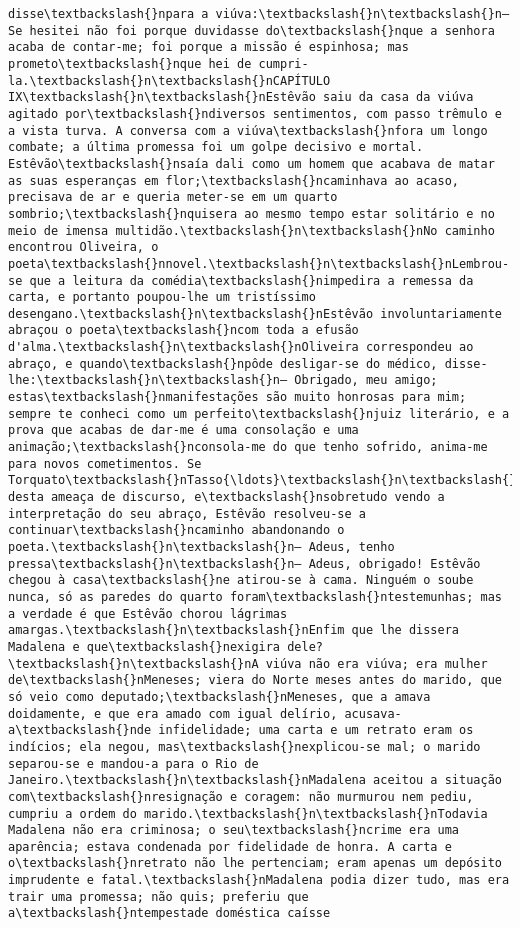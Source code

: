\begin{Verbatim}[commandchars=\\\{\}]
disse\textbackslash{}npara a viúva:\textbackslash{}n\textbackslash{}n— Se hesitei não foi porque duvidasse do\textbackslash{}nque a senhora acaba de contar-me; foi porque a missão é espinhosa; mas prometo\textbackslash{}nque hei de cumpri-la.\textbackslash{}n\textbackslash{}nCAPÍTULO IX\textbackslash{}n\textbackslash{}nEstêvão saiu da casa da viúva agitado por\textbackslash{}ndiversos sentimentos, com passo trêmulo e a vista turva. A conversa com a viúva\textbackslash{}nfora um longo combate; a última promessa foi um golpe decisivo e mortal. Estêvão\textbackslash{}nsaía dali como um homem que acabava de matar as suas esperanças em flor;\textbackslash{}ncaminhava ao acaso, precisava de ar e queria meter-se em um quarto sombrio;\textbackslash{}nquisera ao mesmo tempo estar solitário e no meio de imensa multidão.\textbackslash{}n\textbackslash{}nNo caminho encontrou Oliveira, o poeta\textbackslash{}nnovel.\textbackslash{}n\textbackslash{}nLembrou-se que a leitura da comédia\textbackslash{}nimpedira a remessa da carta, e portanto poupou-lhe um tristíssimo desengano.\textbackslash{}n\textbackslash{}nEstêvão involuntariamente abraçou o poeta\textbackslash{}ncom toda a efusão d'alma.\textbackslash{}n\textbackslash{}nOliveira correspondeu ao abraço, e quando\textbackslash{}npôde desligar-se do médico, disse-lhe:\textbackslash{}n\textbackslash{}n— Obrigado, meu amigo; estas\textbackslash{}nmanifestações são muito honrosas para mim; sempre te conheci como um perfeito\textbackslash{}njuiz literário, e a prova que acabas de dar-me é uma consolação e uma animação;\textbackslash{}nconsola-me do que tenho sofrido, anima-me para novos cometimentos. Se Torquato\textbackslash{}nTasso{\ldots}\textbackslash{}n\textbackslash{}nDiante desta ameaça de discurso, e\textbackslash{}nsobretudo vendo a interpretação do seu abraço, Estêvão resolveu-se a continuar\textbackslash{}ncaminho abandonando o poeta.\textbackslash{}n\textbackslash{}n— Adeus, tenho pressa\textbackslash{}n\textbackslash{}n— Adeus, obrigado! Estêvão chegou à casa\textbackslash{}ne atirou-se à cama. Ninguém o soube nunca, só as paredes do quarto foram\textbackslash{}ntestemunhas; mas a verdade é que Estêvão chorou lágrimas amargas.\textbackslash{}n\textbackslash{}nEnfim que lhe dissera Madalena e que\textbackslash{}nexigira dele?\textbackslash{}n\textbackslash{}nA viúva não era viúva; era mulher de\textbackslash{}nMeneses; viera do Norte meses antes do marido, que só veio como deputado;\textbackslash{}nMeneses, que a amava doidamente, e que era amado com igual delírio, acusava-a\textbackslash{}nde infidelidade; uma carta e um retrato eram os indícios; ela negou, mas\textbackslash{}nexplicou-se mal; o marido separou-se e mandou-a para o Rio de Janeiro.\textbackslash{}n\textbackslash{}nMadalena aceitou a situação com\textbackslash{}nresignação e coragem: não murmurou nem pediu, cumpriu a ordem do marido.\textbackslash{}n\textbackslash{}nTodavia Madalena não era criminosa; o seu\textbackslash{}ncrime era uma aparência; estava condenada por fidelidade de honra. A carta e o\textbackslash{}nretrato não lhe pertenciam; eram apenas um depósito imprudente e fatal.\textbackslash{}nMadalena podia dizer tudo, mas era trair uma promessa; não quis; preferiu que a\textbackslash{}ntempestade doméstica caísse 
\end{Verbatim}
